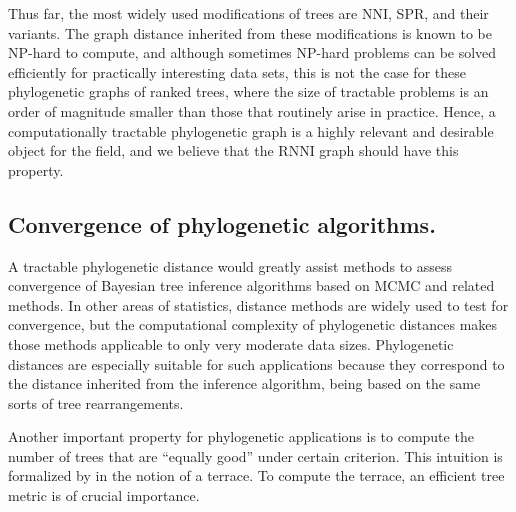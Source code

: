 \documentclass[11pt]{amsart}
\theoremstyle{definition}
\newcommand{\nni}{\mathrm{NNI}}
\newcommand{\rnni}{\mathrm{RNNI}}
\begin{document}
Thus far, the most widely used modifications of trees are $\nni$, SPR, and their variants.
The graph distance inherited from these modifications is known to be NP-hard to compute, and although sometimes NP-hard problems can be solved efficiently for practically interesting data sets, this is not the case for these phylogenetic graphs of ranked trees, where the size of tractable problems is an order of magnitude smaller than those that routinely arise in practice.
Hence, a computationally tractable phylogenetic graph is a highly relevant and desirable object for the field, and we believe that the $\rnni$ graph should have this property.


\subsection{Convergence of phylogenetic algorithms.}

A tractable phylogenetic distance would greatly assist methods to assess convergence of Bayesian tree inference algorithms based on MCMC and related methods.
In other areas of statistics, distance methods are widely used to test for convergence, but the computational complexity of phylogenetic distances makes those methods applicable to only very moderate data sizes.
Phylogenetic distances are especially suitable for such applications because they correspond to the distance inherited from the inference algorithm, being based on the same sorts of tree rearrangements.

Another important property for phylogenetic applications is to compute the number of trees that are ``equally good'' under certain criterion.
This intuition is formalized by \textcite{Sanderson2011-zp} in the notion of a terrace.
To compute the terrace, an efficient tree metric is of crucial importance.


\printbibliography
\end{document}
